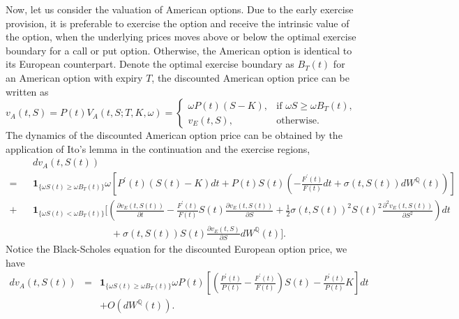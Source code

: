 \documentclass[12pt]{article}
\begin{document}
    Now, let us consider the valuation of American options. Due to the early exercise provision, it is preferable
    to exercise the option and receive the intrinsic value of the option, when the underlying prices moves above or
    below the optimal exercise boundary for a call or put option. Otherwise, the American option is identical to
    its European counterpart. Denote the optimal exercise boundary as $B_T(t)$ for an American option with expiry
    $T$, the discounted American option price can be written as
    \begin{equation}
      v_A(t,S)=P(t)V_A(t,S;T,K,\omega)
              =\begin{cases}
                 \omega P(t)\left(S-K\right), & \mbox{if } \omega S \geq \omega B_T(t),\\
                 v_E(t,S), & \mbox{otherwise}.
               \end{cases}
    \end{equation}
    The dynamics of the discounted American option price can be obtained by the application of Ito's lemma in the
    continuation and the exercise regions,
    \begin{eqnarray}
      &&dv_A(t,S(t)) \nonumber\\
      =&&\mathbf{1}_{\{\omega S(t) \geq \omega B_T(t)\}}\omega\left[P^{\prime}(t)\left(S(t)-K\right)dt
                  +P(t)S(t)\left(-\frac{F^{\prime}(t)}{F(t)}dt+\sigma(t,S(t))dW^{\mathbb Q}(t)\right)\right]\nonumber\\
      +  && \mathbf{1}_{\{\omega S(t)<\omega B_T(t)\}}\bigg[\left(\frac{\partial v_E(t,S(t))}{\partial t}-\frac{F^{\prime}(t)}{F(t)}S(t)\frac{\partial v_E(t,S(t))}{\partial S}
               +\frac{1}{2}\sigma(t,S(t))^2S(t)^2\frac{\partial^2 v_E(t,S(t))}{\partial S^2}\right)dt\nonumber\\
               &&\quad\quad\quad\quad\quad\quad\quad\quad +\sigma(t, S(t))S(t)\frac{\partial v_E(t,S)}{\partial S}dW^{\mathbb Q}(t)\bigg].
    \end{eqnarray}
    Notice the Black-Scholes equation for the discounted European option price, we have
    \begin{eqnarray}
      dv_A(t,S(t))&=&\mathbf{1}_{\{\omega S(t)\geq\omega B_T(t)\}}\omega P(t)
                     \left[\left(\frac{P^{\prime}(t)}{P(t)}-\frac{F^{\prime}(t)}{F(t)}\right)S(t)
                           -\frac{P^{\prime}(t)}{P(t)}K\right]dt\nonumber\\
               && + O\left(dW^{\mathbb Q}(t)\right).
    \end{eqnarray}
\end{document}
